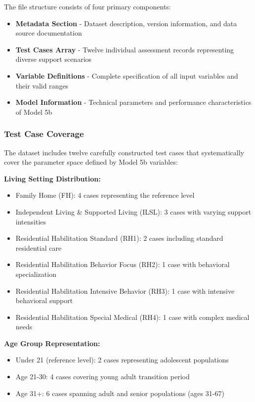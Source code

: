 The file structure consists of four primary components:

\begin{itemize}
    \item \textbf{Metadata Section} - Dataset description, version information, and data source documentation
    \item \textbf{Test Cases Array} - Twelve individual assessment records representing diverse support scenarios
    \item \textbf{Variable Definitions} - Complete specification of all input variables and their valid ranges
    \item \textbf{Model Information} - Technical parameters and performance characteristics of Model 5b
\end{itemize}

\subsubsection{Test Case Coverage}

The dataset includes twelve carefully constructed test cases that systematically cover the parameter space defined by Model 5b variables:

\textbf{Living Setting Distribution:}
\begin{itemize}
    \item Family Home (FH): 4 cases representing the reference level
    \item Independent Living \& Supported Living (ILSL): 3 cases with varying support intensities
    \item Residential Habilitation Standard (RH1): 2 cases including standard residential care
    \item Residential Habilitation Behavior Focus (RH2): 1 case with behavioral specialization
    \item Residential Habilitation Intensive Behavior (RH3): 1 case with intensive behavioral support
    \item Residential Habilitation Special Medical (RH4): 1 case with complex medical needs
\end{itemize}

\textbf{Age Group Representation:}
\begin{itemize}
    \item Under 21 (reference level): 2 cases representing adolescent populations
    \item Age 21-30: 4 cases covering young adult transition period
    \item Age 31+: 6 cases spanning adult and senior populations (ages 31-67)
\end{itemize}

